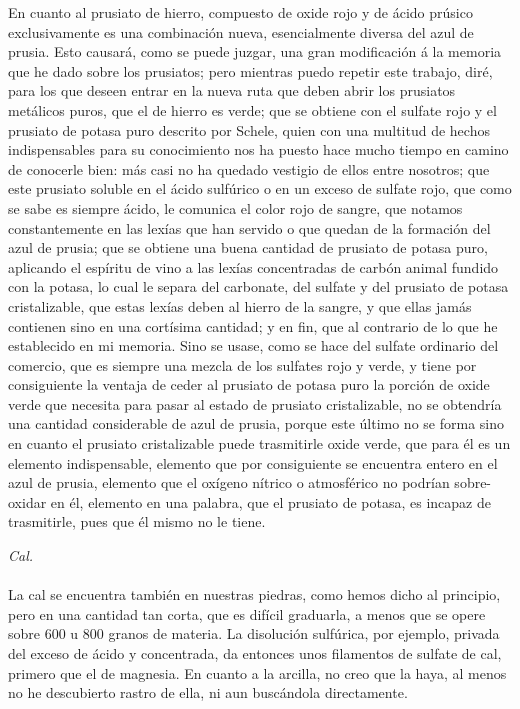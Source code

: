 \documentclass[a4paper, 12pt, oneside, spanish]{article}
\begin{document}
En cuanto al prusiato de hierro, compuesto de oxide rojo y de ácido prúsico exclusivamente es una combinación nueva, esencialmente diversa del azul de prusia. Esto causará, como se puede juzgar, una gran modificación á la memoria que he dado sobre los prusiatos; pero mientras puedo repetir este trabajo, diré, para los que deseen entrar en la nueva ruta que deben abrir los prusiatos metálicos puros, que el de hierro es verde; que se obtiene con el sulfate rojo y el prusiato de potasa puro descrito por Schele, quien con una multitud de hechos indispensables para su conocimiento nos ha puesto hace mucho tiempo en camino de conocerle bien: más casi no ha quedado vestigio de ellos entre nosotros; que este prusiato soluble en el ácido sulfúrico o en un exceso de sulfate rojo, que como se sabe es siempre ácido, le comunica el color rojo de sangre, que notamos constantemente en las lexías que han servido o que quedan de la formación del azul de prusia; que se obtiene una buena cantidad de prusiato de potasa puro, aplicando el espíritu de vino a las lexías concentradas de carbón animal fundido con la potasa, lo cual le separa del carbonate, del sulfate y del prusiato de potasa cristalizable, que estas lexías deben al hierro de la sangre, y que ellas jamás contienen sino en una cortísima cantidad; y en fin, que al contrario de lo que he establecido en mi memoria. Sino se usase, como se hace del sulfate ordinario del comercio, que es siempre una mezcla de los sulfates rojo y verde, y tiene por consiguiente la ventaja de ceder al prusiato de potasa puro la porción de oxide verde que necesita para pasar al estado de prusiato cristalizable, no se obtendría una cantidad considerable de azul de prusia, porque este último no se forma sino en cuanto el prusiato cristalizable puede trasmitirle oxide verde, que para él es un elemento indispensable, elemento que por consiguiente se encuentra entero en el azul de prusia, elemento que el oxígeno nítrico o atmosférico no podrían sobre-oxidar en él, elemento en una palabra, que el prusiato de potasa, es incapaz de trasmitirle, pues que él mismo no le tiene.
\begin{center}
\emph{Cal.}
\end{center}
\paragraph{}
La cal se encuentra también en nuestras piedras, como hemos dicho al principio, pero en una cantidad tan corta, que es difícil graduarla, a menos que se opere sobre 600 u 800 granos de materia. La disolución sulfúrica, por ejemplo, privada del exceso de ácido y concentrada, da entonces unos filamentos de sulfate de cal, primero que el de magnesia. En cuanto a la arcilla, no creo que la haya, al menos no he descubierto rastro de ella, ni aun buscándola directamente.
\end{document}

